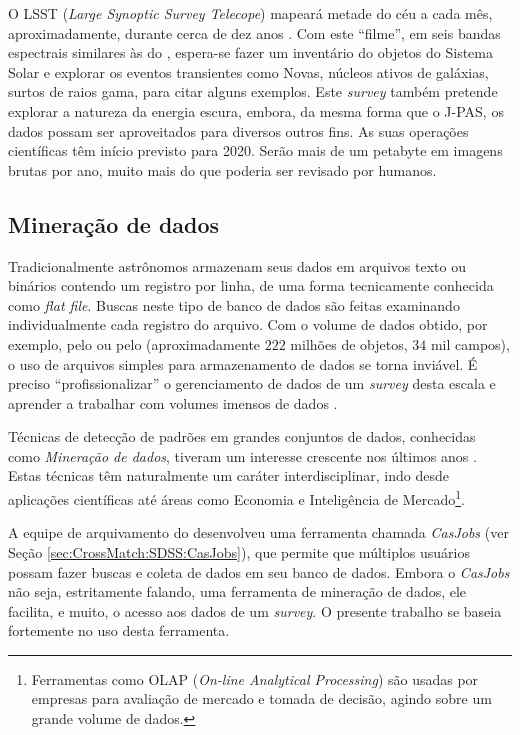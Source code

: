 O LSST ({\em Large Synoptic Survey Telecope}) mapeará metade do céu a cada mês,
aproximadamente, durante cerca de dez anos \citep{Ivezic2008}. Com este
``filme'', em seis bandas espectrais similares às do \SDSS, espera-se fazer um
inventário do objetos do Sistema Solar e explorar os eventos transientes como
Novas, núcleos ativos de galáxias, surtos de raios gama, para citar alguns
exemplos. Este {\em survey} também pretende explorar a natureza da energia
escura, embora, da mesma forma que o J-PAS, os dados possam ser aproveitados
para diversos outros fins. As suas operações científicas têm início previsto
para 2020. Serão mais de um petabyte em imagens brutas por ano, muito mais do
que poderia ser revisado por humanos.

\subsection{Mineração de dados}

Tradicionalmente astrônomos armazenam seus dados em arquivos texto ou binários
contendo um registro por linha, de uma forma tecnicamente conhecida como {\em
flat file}. Buscas neste tipo de banco de dados são feitas examinando
individualmente cada registro do arquivo. Com o volume de dados obtido, por
exemplo, pelo \SDSS ou pelo \galex (aproximadamente $222$ milhões de objetos,
$34$ mil campos), o uso de arquivos simples para armazenamento de dados se torna
inviável. É preciso ``profissionalizar'' o gerenciamento de dados de um {\em
survey} desta escala e aprender a trabalhar com volumes imensos de dados
\citep{Bell2006}.

Técnicas de detecção de padrões em grandes conjuntos de dados, conhecidas como
{\em Mineração de dados}, tiveram um interesse crescente nos últimos anos
\citep{SIGKDD2011}. Estas técnicas têm naturalmente um caráter interdisciplinar,
indo desde aplicações científicas até áreas como Economia \citep{Spanos2000} e
Inteligência de Mercado\footnote{Ferramentas como OLAP ({\em On-line Analytical
Processing}) são usadas por empresas para avaliação de mercado e tomada de
decisão, agindo sobre um grande volume de dados.}.

A equipe de arquivamento do \SDSS desenvolveu uma ferramenta chamada {\em
CasJobs} (ver Seção \ref{sec:CrossMatch:SDSS:CasJobs}), que permite que
múltiplos usuários possam fazer buscas e coleta de dados em seu banco de dados.
Embora o {\em CasJobs} não seja, estritamente falando, uma ferramenta de
mineração de dados, ele facilita, e muito, o acesso aos dados de um {\em
survey}. O presente trabalho se baseia fortemente no uso desta ferramenta.



